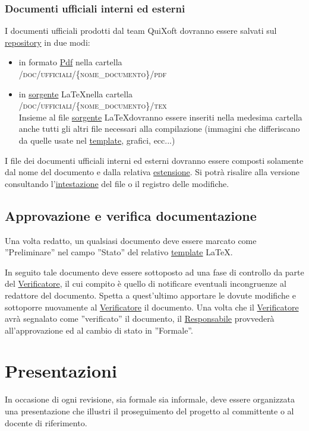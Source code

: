 \documentclass[11pt,a4paper]{article}
\begin{document}
\subsubsection{Documenti ufficiali interni ed esterni}
I documenti ufficiali prodotti dal team QuiXoft dovranno essere salvati sul \underline{repository} in due modi:
\begin{itemize}
	\item in formato \underline{Pdf} nella cartella 
\\ \textsc{/doc/ufficiali/\{nome\_documento\}/pdf}
	\item in \underline{sorgente} \LaTeX \space nella cartella 
\\ \textsc{/doc/ufficiali/\{nome\_documento\}/tex}
\\ Insieme al file \underline{sorgente} \LaTeX \space dovranno essere inseriti nella medesima cartella anche tutti gli altri file necessari alla compilazione (immagini che differiscano da quelle usate nel \underline{template}, grafici, ecc...)
\end{itemize}
I file dei documenti ufficiali interni ed esterni dovranno essere composti solamente dal nome del documento e dalla relativa \underline{estensione}. Si potrà risalire alla versione consultando l'\underline{intestazione} del file o il registro delle modifiche.
\subsection{Approvazione e verifica documentazione}
Una volta redatto, un qualsiasi documento deve essere marcato come ''Preliminare'' nel campo ''Stato'' del relativo \underline{template} \LaTeX.

In seguito tale documento deve essere sottoposto ad una fase di controllo da parte del \underline{Verificatore}, il cui compito è quello di notificare eventuali incongruenze al redattore del documento.
Spetta a quest'ultimo apportare le dovute modifiche e sottoporre nuovamente al \underline{Verificatore} il documento.
Una volta che il \underline{Verificatore} avrà segnalato come ''verificato'' il documento, il \underline{Responsabile} provvederà all'approvazione ed al cambio di stato in ''Formale''.
\section{Presentazioni}
In occasione di ogni revisione, sia formale sia informale, deve essere organizzata una presentazione che illustri il proseguimento del progetto al committente o al docente di riferimento.
\end{document}
